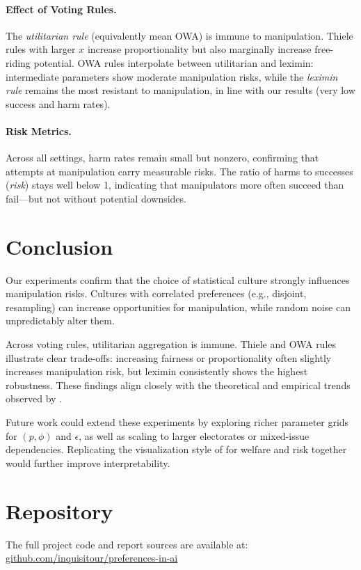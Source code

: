 \documentclass[11pt]{article}
\begin{document}
\paragraph{Effect of Voting Rules.}
The \emph{utilitarian rule} (equivalently mean OWA) is immune to manipulation.
Thiele rules with larger $x$ increase proportionality but also marginally
increase free-riding potential. OWA rules interpolate between utilitarian and
leximin: intermediate parameters show moderate manipulation risks, while the
\emph{leximin rule} remains the most resistant to manipulation, in line with
our results (very low success and harm rates).

\paragraph{Risk Metrics.}
Across all settings, harm rates remain small but nonzero, confirming that
attempts at manipulation carry measurable risks. The ratio of harms to
successes (\emph{risk}) stays well below 1, indicating that manipulators more
often succeed than fail—but not without potential downsides.

\section{Conclusion}
Our experiments confirm that the choice of statistical culture strongly
influences manipulation risks. Cultures with correlated preferences (e.g.,
disjoint, resampling) can increase opportunities for manipulation, while random
noise can unpredictably alter them.

Across voting rules, utilitarian aggregation is immune. Thiele and OWA rules
illustrate clear trade-offs: increasing fairness or proportionality often
slightly increases manipulation risk, but leximin consistently shows the
highest robustness. These findings align closely with the theoretical and
empirical trends observed by \cite{lackner2023freeriding}.

Future work could extend these experiments by exploring richer parameter grids
for $(p,\phi)$ and $\epsilon$, as well as scaling to larger electorates or
mixed-issue dependencies. Replicating the visualization style of
\cite{lackner2023freeriding} for welfare and risk together would further
improve interpretability.

\section*{Repository}
The full project code and report sources are available at: \\
\href{https://github.com/inquisitour/preferences-in-ai}{github.com/inquisitour/preferences-in-ai}



\end{document}
